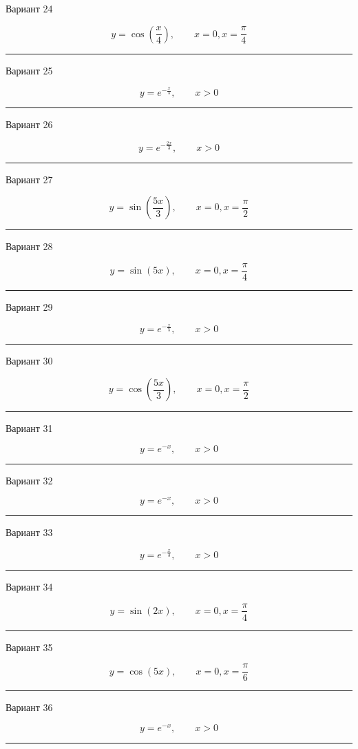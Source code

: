 \documentclass[11pt]{report}
\begin{document}
Вариант 24

$$y=\cos{\left(\frac{x}{4} \right)}, \qquad x = 0, x = \frac{\pi}{4}$$

\rule{\textwidth}{.2mm}

Вариант 25

$$y=e^{- \frac{x}{5}}, \qquad x > 0$$

\rule{\textwidth}{.2mm}

Вариант 26

$$y=e^{- \frac{2 x}{3}}, \qquad x > 0$$

\rule{\textwidth}{.2mm}

Вариант 27

$$y=\sin{\left(\frac{5 x}{3} \right)}, \qquad x = 0, x = \frac{\pi}{2}$$

\rule{\textwidth}{.2mm}

Вариант 28

$$y=\sin{\left(5 x \right)}, \qquad x = 0, x = \frac{\pi}{4}$$

\rule{\textwidth}{.2mm}
Вариант 29

$$y=e^{- \frac{x}{5}}, \qquad x > 0$$

\rule{\textwidth}{.2mm}

Вариант 30

$$y=\cos{\left(\frac{5 x}{3} \right)}, \qquad x = 0, x = \frac{\pi}{2}$$

\rule{\textwidth}{.2mm}

Вариант 31

$$y=e^{- x}, \qquad x > 0$$

\rule{\textwidth}{.2mm}

Вариант 32

$$y=e^{- x}, \qquad x > 0$$

\rule{\textwidth}{.2mm}

Вариант 33

$$y=e^{- \frac{x}{3}}, \qquad x > 0$$

\rule{\textwidth}{.2mm}

Вариант 34

$$y=\sin{\left(2 x \right)}, \qquad x = 0, x = \frac{\pi}{4}$$

\rule{\textwidth}{.2mm}

Вариант 35

$$y=\cos{\left(5 x \right)}, \qquad x = 0, x = \frac{\pi}{6}$$

\rule{\textwidth}{.2mm}

Вариант 36

$$y=e^{- x}, \qquad x > 0$$

\rule{\textwidth}{.2mm}
\end{document}
